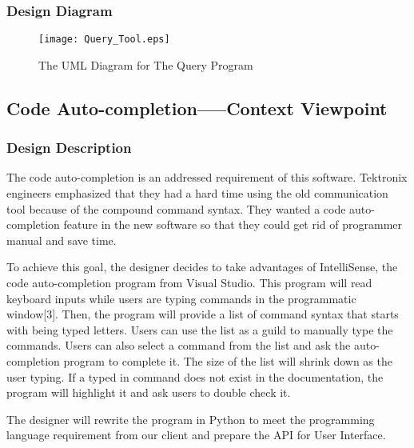 \documentclass [10pt]{article}
\begin{document}
\subsubsection{Design Diagram}
\begin{figure}[ht]
\centering
\texttt{[image: Query\_Tool.eps]}
\caption{The UML Diagram for The Query Program}
\end{figure}


\subsection{Code Auto-completion-----Context Viewpoint}
\subsubsection{Design Description}
The code auto-completion is an addressed requirement of this software. Tektronix engineers emphasized that they had a hard time using the old communication tool because of the compound command syntax. They wanted a code auto-completion feature in the new software so that they could get rid of programmer manual and save time.\par
To achieve this goal, the designer decides to take advantages of IntelliSense, the code auto-completion program from Visual Studio. This program will read keyboard inputs while users are typing commands in the programmatic window[3]. Then, the program will provide a list of command syntax that starts with being typed letters. Users can use the list as a guild to manually type the commands. Users can also select a command from the list and ask the auto-completion program to complete it. The size of the list will shrink down as the user typing. If a typed in command does not exist in the documentation, the program will highlight it and ask users to double check it.\par 
The designer will rewrite the program in Python to meet the programming language requirement from our client and prepare the API for User Interface.
\end{document}
